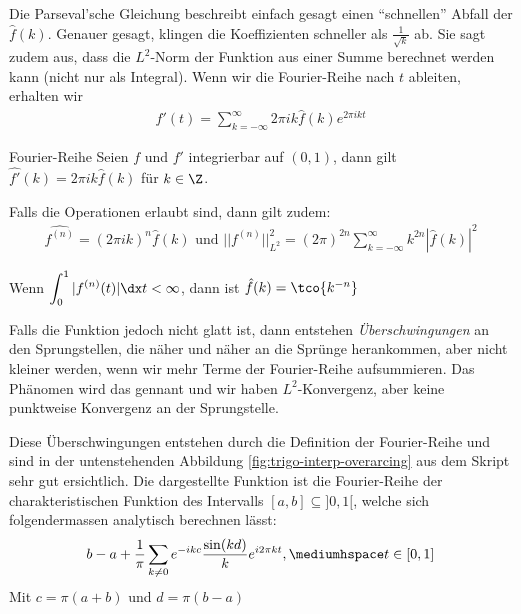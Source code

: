 
\setcounter{all}{14}
\inlineremark Die Parseval'sche Gleichung beschreibt einfach gesagt einen ``schnellen'' Abfall der $\hat{f}(k)$.
Genauer gesagt, klingen die Koeffizienten schneller als $\frac{1}{\sqrt{k}}$ ab.
Sie sagt zudem aus, dass die $L^2$-Norm der Funktion aus einer Summe berechnet werden kann (nicht nur als Integral).
Wenn wir die Fourier-Reihe nach $t$ ableiten, erhalten wir
\rmvspace
\begin{align*}
    f'(t) = \sum_{k = -\infty}^{\infty} 2\pi ik\hat{f}(k)e^{2\pi ikt}
\end{align*}

\begin{theorem}[]{Fourier-Reihe}
    Seien $f$ und $f'$ integrierbar auf $(0, 1)$, dann gilt $\hat{f'}(k) = 2\pi ik\hat{f}(k)$ für $k \in \Z$.

    Falls die Operationen erlaubt sind, dann gilt zudem:
    \rmvspace
    \begin{align*}
        \hat{f^{(n)}} = (2\pi ik)^n \hat{f}(k) \text{ und } ||f^{(n)}||_{L^2}^2 = (2\pi)^{2n} \sum_{k = -\infty}^{\infty} k^{2n} |\hat{f}(k)|^2
    \end{align*}
\end{theorem}


\inlinetheorem Wenn $\displaystyle \int_{0}^{1} |f^{(n)}(t)|\dx t < \infty$, dann ist $\hat{f}(k) = \tco{k^{-n}}$

Falls die Funktion jedoch nicht glatt ist, dann entstehen \textit{Überschwingungen} an den Sprungstellen, die näher und näher an die Sprünge herankommen, aber nicht kleiner werden, wenn wir mehr Terme der Fourier-Reihe aufsummieren.
Das Phänomen wird das  gennant und wir haben $L^2$-Konvergenz, aber keine punktweise Konvergenz an der Sprungstelle.

\inlineremark
Diese Überschwingungen entstehen durch die Definition der Fourier-Reihe und sind in der untenstehenden Abbildung \ref{fig:trigo-interp-overarcing} aus dem Skript sehr gut ersichtlich.
Die dargestellte Funktion ist die Fourier-Reihe der charakteristischen Funktion des Intervalls $[a, b] \subseteq ]0, 1[$, welche sich folgendermassen analytisch berechnen lässt:
\begin{align*}
    b - a + \frac{1}{\pi} \sum_{k \neq 0} e^{-ikc}\frac{\sin(kd)}{k} e^{i2\pi kt}, \mediumhspace t \in [0, 1]
\end{align*}
Mit $c = \pi(a + b)$ und $d = \pi(b - a)$

